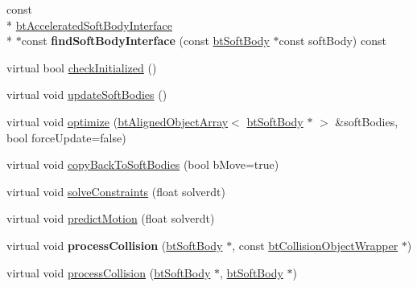 \begin{DoxyCompactItemize}
\item 
\hypertarget{classbt_d_x11_soft_body_solver_a334197c2fee9fb6c0cc937d3c71b1076}{const \\*
\hyperlink{classbt_d_x11_soft_body_solver_1_1bt_accelerated_soft_body_interface}{bt\+Accelerated\+Soft\+Body\+Interface} \\*
$\ast$const {\bfseries find\+Soft\+Body\+Interface} (const \hyperlink{classbt_soft_body}{bt\+Soft\+Body} $\ast$const soft\+Body) const }\label{classbt_d_x11_soft_body_solver_a334197c2fee9fb6c0cc937d3c71b1076}

\item 
virtual bool \hyperlink{classbt_d_x11_soft_body_solver_a22b92962365db3adc0086eaac84dde9f}{check\+Initialized} ()
\item 
virtual void \hyperlink{classbt_d_x11_soft_body_solver_a14550caa4b6eb1be4c47cef4a4b40336}{update\+Soft\+Bodies} ()
\item 
virtual void \hyperlink{classbt_d_x11_soft_body_solver_a1d181b7e59619553241ac463db54c490}{optimize} (\hyperlink{classbt_aligned_object_array}{bt\+Aligned\+Object\+Array}$<$ \hyperlink{classbt_soft_body}{bt\+Soft\+Body} $\ast$ $>$ \&soft\+Bodies, bool force\+Update=false)
\item 
virtual void \hyperlink{classbt_d_x11_soft_body_solver_a0364c3791bd12386e32e9357546aeee0}{copy\+Back\+To\+Soft\+Bodies} (bool b\+Move=true)
\item 
virtual void \hyperlink{classbt_d_x11_soft_body_solver_ab6477819156cdc0f5850514683b77f08}{solve\+Constraints} (float solverdt)
\item 
virtual void \hyperlink{classbt_d_x11_soft_body_solver_a2565453dfc806f819746d7bc04a57a96}{predict\+Motion} (float solverdt)
\item 
\hypertarget{classbt_d_x11_soft_body_solver_acbb4b303c74a6b2852cb5bc3038c5404}{virtual void {\bfseries process\+Collision} (\hyperlink{classbt_soft_body}{bt\+Soft\+Body} $\ast$, const \hyperlink{structbt_collision_object_wrapper}{bt\+Collision\+Object\+Wrapper} $\ast$)}\label{classbt_d_x11_soft_body_solver_acbb4b303c74a6b2852cb5bc3038c5404}

\item 
virtual void \hyperlink{classbt_d_x11_soft_body_solver_a74adb4cab44b9058b9d67b7b8116d30e}{process\+Collision} (\hyperlink{classbt_soft_body}{bt\+Soft\+Body} $\ast$, \hyperlink{classbt_soft_body}{bt\+Soft\+Body} $\ast$)
\end{DoxyCompactItemize}
